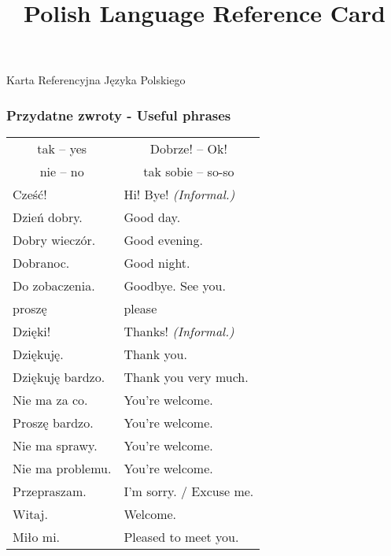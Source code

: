 \documentclass[12pt]{refcard}
\title{Polish Language Reference Card}
\newcommand{\singlec}[1]{\multicolumn{1}{c}{#1}}
\begin{document}
\centering

\maketitle
\vspace{-1ex}
Karta Referencyjna Języka Polskiego

\subsubsection{Przydatne zwroty - Useful phrases}
\vspace{-1ex}
\begin{tabular}{ll}
\singlec{tak -- yes}   & \singlec{Dobrze! -- Ok!}       \\
\singlec{nie -- no}    & \singlec{tak sobie -- so-so}   \\[1ex]

Cześć!                 & Hi! Bye! \emph{(Informal.)}    \\
Dzień dobry.           & Good day.                      \\
Dobry wieczór.         & Good evening.                  \\
Dobranoc.              & Good night.                    \\
Do zobaczenia.         & Goodbye.  See you.             \\[1ex]

proszę                 & please                         \\
Dzięki!                & Thanks! \emph{(Informal.)}     \\
Dziękuję.              & Thank you.                     \\
Dziękuję bardzo.       & Thank you very much.           \\[1ex]

Nie ma za co.          & You're welcome.                \\
Proszę bardzo.         & You're welcome.                \\
Nie ma sprawy.         & You're welcome.                \\
Nie ma problemu.       & You're welcome.                \\[1ex]

Przepraszam.           & I'm sorry. / Excuse me.        \\[1ex]

Witaj.                 & Welcome.                       \\
Miło mi.               & Pleased to meet you.           \\[1ex]


\end{tabular}
\end{document}
